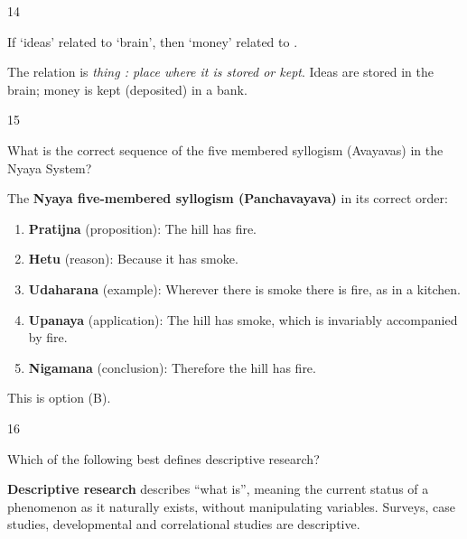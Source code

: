 \begin{question}{14}
{If `ideas' related to `brain', then `money' related to \blank{}.\par}
\begin{explain}
The relation is \emph{thing : place where it is stored or kept}. Ideas are stored in the brain; money is kept (deposited) in a bank.
\end{explain}
\end{question}

\begin{question}{15}
{What is the correct sequence of the five membered syllogism (Avayavas) in the Nyaya System?\par}
\begin{explain}
The \textbf{Nyaya five-membered syllogism (Panchavayava)} in its correct order:
\begin{enumerate}
\item \textbf{Pratijna} (proposition): The hill has fire.
\item \textbf{Hetu} (reason): Because it has smoke.
\item \textbf{Udaharana} (example): Wherever there is smoke there is fire, as in a kitchen.
\item \textbf{Upanaya} (application): The hill has smoke, which is invariably accompanied by fire.
\item \textbf{Nigamana} (conclusion): Therefore the hill has fire.
\end{enumerate}
This is option (B).
\end{explain}
\end{question}

\begin{question}{16}
{Which of the following best defines descriptive research?\par}
\begin{explain}
\textbf{Descriptive research} describes ``what is'', meaning the current status of a phenomenon as it naturally exists, without manipulating variables. Surveys, case studies, developmental and correlational studies are descriptive.
\end{explain}
\end{question}

